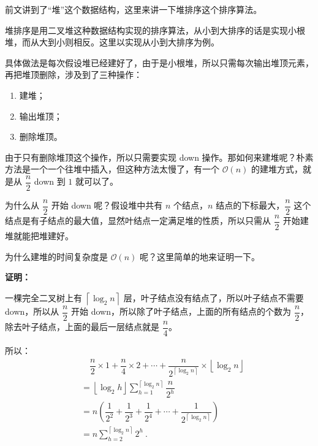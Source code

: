 

前文讲到了“堆”这个数据结构，这里来讲一下堆排序这个排序算法。

堆排序是用二叉堆这种数据结构实现的排序算法，从小到大排序的话是实现小根堆，而从大到小则相反。这里以实现从小到大排序为例。

具体做法是每次假设堆已经建好了，由于是小根堆，所以只需每次输出堆顶元素，再把堆顶删除，涉及到了三种操作：

\begin{enumerate}
\item 建堆；
\item 输出堆顶；
\item 删除堆顶。
\end{enumerate}

由于只有删除堆顶这个操作，所以只需要实现 down 操作。那如何来建堆呢？朴素方法是一个一个往堆中插入，但这种方法太慢了，有一个 $\mathcal{O}(n)$ 的建堆方式，就是从 $\dfrac{n}{2}$ down 到 $1$ 就可以了。 

为什么从 $\dfrac{n}{2}$ 开始 down 呢？假设堆中共有 $n$ 个结点，$n$ 结点的下标最大，$\dfrac{n}{2}$ 这个结点是有子结点的最大值，显然叶结点一定满足堆的性质，所以只需从 $\dfrac{n}{2}$ 开始建堆就能把堆建好。

为什么建堆的时间复杂度是 $\mathcal{O}(n)$ 呢？这里简单的地来证明一下。

\textbf{证明：}

一棵完全二叉树上有 $\left\lceil{\log_2 n}\right\rceil$ 层，叶子结点没有结点了，所以叶子结点不需要 down，所以从 $\dfrac{n}{2}$ 开始 down，所以除了叶子结点，上面的所有结点的个数为 $\dfrac{n}{2}$，除去叶子结点，上面的最后一层结点就是 $\dfrac{n}{4}$。

所以：
\begin{equation}
\begin{aligned}
&\quad\dfrac{n}{2} \times 1 + \dfrac{n}{4} \times 2 + \cdots + \dfrac{n}{2^{\left\lceil{\log_2 n}\right\rceil}} \times \left\lfloor{\log_2 n}\right\rfloor \\
&= \left\lfloor{\log_2 h}\right\rfloor \sum ^ {\left\lceil{\log_2 n}\right\rceil} _ {h=1} \dfrac{n}{2^h} \\
&= n(\dfrac{1}{2^2} + \dfrac{1}{2^3} + \dfrac{1}{2^4} + \cdots +\dfrac{1}{2^{\left\lceil{\log_2 n}\right\rceil}}) \\
&= n \sum^{\left\lceil{\log_2 n}\right\rceil} _ {h = 2} 2^h~.\\
\end{aligned}
\end{equation}

